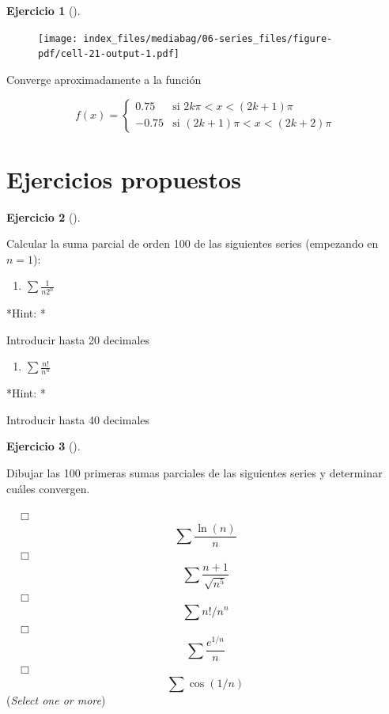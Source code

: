 \documentclass[
  a4paper,
]{scrreport}
\providecommand{\tightlist}{%
  \setlength{\itemsep}{0pt}\setlength{\parskip}{0pt}}\usepackage{longtable,booktabs,array}
\theoremstyle{definition}
\newtheorem{exercise}{Ejercicio}[chapter]
\theoremstyle{remark}
\begin{document}
\begin{exercise}[]
\begin{tcolorbox}
\begin{figure}[H]

{\centering \texttt{[image: index\_files/mediabag/06-series\_files/figure-pdf/cell-21-output-1.pdf]}

}

\end{figure}

Converge aproximadamente a la función

\[
f(x)=\begin{cases}
0.75 & \mbox{si $2k\pi<x<(2k+1)\pi$}\\
-0.75 & \mbox{si $(2k+1)\pi<x<(2k+2)\pi$}
\end{cases}
\]

\end{tcolorbox}

\end{exercise}

\hypertarget{ejercicios-propuestos-4}{%
\section{Ejercicios propuestos}\label{ejercicios-propuestos-4}}

\begin{exercise}[]\protect\hypertarget{exr-series-propuesto-1}{}\label{exr-series-propuesto-1}

Calcular la suma parcial de orden 100 de las siguientes series
(empezando en \(n=1\)):

\begin{enumerate}
\def\labelenumi{\alph{enumi}.}
\tightlist
\item
  \(\sum \frac{1}{n2^n}\)
\end{enumerate}

\vspace{18pt}*Hint: *

Introducir hasta 20 decimales

\begin{enumerate}
\def\labelenumi{\alph{enumi}.}
\setcounter{enumi}{1}
\tightlist
\item
  \(\sum \frac{n!}{n^n}\)
\end{enumerate}

\vspace{18pt}*Hint: *

Introducir hasta 40 decimales

\end{exercise}

\begin{exercise}[]\protect\hypertarget{exr-series-propuesto-2}{}\label{exr-series-propuesto-2}

Dibujar las 100 primeras sumas parciales de las siguientes series y
determinar cuáles convergen.

${\quad\Box}$ $$\sum \frac{\ln(n)}{n}$$
${\quad\Box}$ $$\sum \frac{n+1}{\sqrt{n^5}}$$
${\quad\Box}$ $$\sum n!/n^n$$
${\quad\Box}$ $$\sum \frac{e^{1/n}}{n}$$
${\quad\Box}$ $$\sum  \cos(1/n)$$
(\emph{Select one or more})

\end{exercise}
\end{document}
